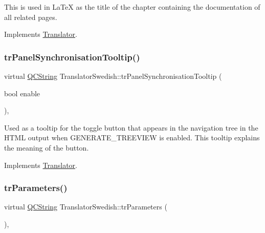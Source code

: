 This is used in La\+TeX as the title of the chapter containing the documentation of all related pages. 

Implements \mbox{\hyperlink{class_translator}{Translator}}.

\mbox{\label{class_translator_swedish_a26c4b6eea9f87a4b0f554dd189e841d5}} 
\subsubsection{\texorpdfstring{trPanelSynchronisationTooltip()}{trPanelSynchronisationTooltip()}}
{\footnotesize\ttfamily virtual \mbox{\hyperlink{class_q_c_string}{Q\+C\+String}} Translator\+Swedish\+::tr\+Panel\+Synchronisation\+Tooltip (\begin{DoxyParamCaption}\item[{bool}]{enable }\end{DoxyParamCaption})\hspace{0.3cm}{\ttfamily [inline]}, {\ttfamily [virtual]}}

Used as a tooltip for the toggle button that appears in the navigation tree in the H\+T\+ML output when G\+E\+N\+E\+R\+A\+T\+E\+\_\+\+T\+R\+E\+E\+V\+I\+EW is enabled. This tooltip explains the meaning of the button. 

Implements \mbox{\hyperlink{class_translator}{Translator}}.

\mbox{\label{class_translator_swedish_af8c993c679bcc09b2012445ea2eca0f2}} 
\subsubsection{\texorpdfstring{trParameters()}{trParameters()}}
{\footnotesize\ttfamily virtual \mbox{\hyperlink{class_q_c_string}{Q\+C\+String}} Translator\+Swedish\+::tr\+Parameters (\begin{DoxyParamCaption}{ }\end{DoxyParamCaption})\hspace{0.3cm}{\ttfamily [inline]}, {\ttfamily [virtual]}}

